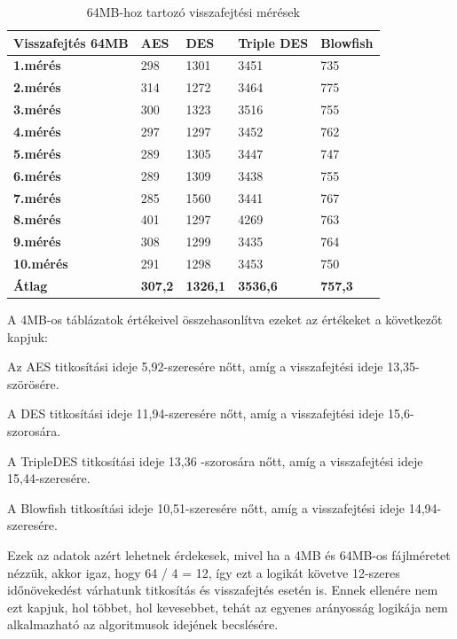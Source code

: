 \begin{table}[H]
	\centering
	\caption{64MB-hoz tartozó visszafejtési mérések}
	\label{tab:dec_64mb}
	\medskip
	\begin{tabular}{|p{2.4cm}|p{2cm}|p{2cm}|p{2cm}|p{2cm}|}
		\hline
		\textbf{Visszafejtés} \newline \textbf{64MB} & \textbf{AES} & \textbf{DES} & \textbf{Triple DES} & \textbf{Blowfish}\\
		\hline
		\textbf{1.mérés} & 298 & 1301 & 3451 & 735\\
		\hline
		\textbf{2.mérés} & 314 & 1272 & 3464 & 775\\
		\hline
		\textbf{3.mérés} & 300 & 1323 & 3516 & 755\\
		\hline
		\textbf{4.mérés} & 297 & 1297 & 3452 & 762\\
		\hline
		\textbf{5.mérés} & 289 & 1305 & 3447 & 747\\
		\hline
		\textbf{6.mérés} & 289 & 1309 & 3438 & 755\\
		\hline
		\textbf{7.mérés} & 285 & 1560 & 3441 & 767\\
		\hline
		\textbf{8.mérés} & 401 & 1297 & 4269 & 763\\
		\hline
		\textbf{9.mérés} & 308 & 1299 & 3435 & 764\\
		\hline
		\textbf{10.mérés} & 291 & 1298 & 3453 & 750\\
		\hline
		\hline
		\textbf{Átlag} & \textbf{307,2} & \textbf{1326,1} & \textbf{3536,6} & \textbf{757,3}\\
		\hline
	\end{tabular}
\end{table}


\noindent A 4MB-os táblázatok értékeivel összehasonlítva ezeket az értékeket a következőt kapjuk:

Az AES titkosítási ideje 5,92-szeresére nőtt, amíg a visszafejtési ideje 13,35-szörösére.

A DES titkosítási ideje 11,94-szeresére nőtt, amíg a visszafejtési ideje 15,6-szorosára.

A TripleDES titkosítási ideje 13,36 -szorosára nőtt, amíg a visszafejtési ideje 15,44-szeresére.

A Blowfish titkosítási ideje 10,51-szeresére nőtt, amíg a visszafejtési ideje 14,94- szeresére.

Ezek az adatok azért lehetnek érdekesek, mivel ha a 4MB és 64MB-os fájlméretet nézzük, akkor igaz, hogy 64 / 4 = 12, így ezt a logikát követve 12-szeres időnövekedést várhatunk titkosítás és visszafejtés esetén is. Ennek ellenére nem ezt kapjuk, hol többet, hol kevesebbet, tehát az egyenes arányosság logikája nem alkalmazható az algoritmusok idejének becslésére.

